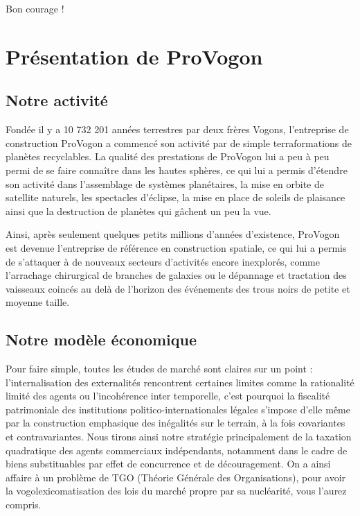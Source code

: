 Bon courage !

\newpage

\section{Présentation de ProVogon}

\subsection{Notre activité}

Fondée il y a 10 732 201 années terrestres par deux frères Vogons, l'entreprise
de construction ProVogon a commencé son activité par de simple terraformations
de planètes recyclables. La qualité des prestations de ProVogon lui a peu à peu
permi de se faire connaître dans les hautes sphères, ce qui lui a permis
d'étendre son activité dans l'assemblage de systèmes planétaires, la mise en
orbite de satellite naturels, les spectacles d'éclipse, la mise en place de
soleils de plaisance ainsi que la destruction de planètes qui gâchent un peu
la vue.

Ainsi, après seulement quelques petits millions d'années d'existence, ProVogon
est devenue l'entreprise de référence en construction spatiale, ce qui lui a
permis de s'attaquer à de nouveaux secteurs d'activités encore inexplorés,
comme l'arrachage chirurgical de branches de galaxies ou le dépannage et
tractation des vaisseaux coincés au delà de l'horizon des événements des trous
noirs de petite et moyenne taille.

\subsection{Notre modèle économique}

Pour faire simple, toutes les études de marché sont claires sur un point :
l'internalisation des externalités rencontrent certaines limites comme la
rationalité limité des agents ou l'incohérence inter temporelle, c'est pourquoi
la fiscalité patrimoniale des institutions politico-internationales légales
s'impose d'elle même par la construction emphasique des inégalités sur le
terrain, à la fois covariantes et contravariantes. Nous tirons ainsi notre
stratégie principalement de la taxation quadratique des agents commerciaux
indépendants, notamment dans le cadre de biens substituables par effet de
concurrence et de découragement. On a ainsi affaire à un problème de TGO
(Théorie Générale des Organisations), pour avoir la vogolexicomatisation des
lois du marché propre par sa nucléarité, vous l'aurez compris.

